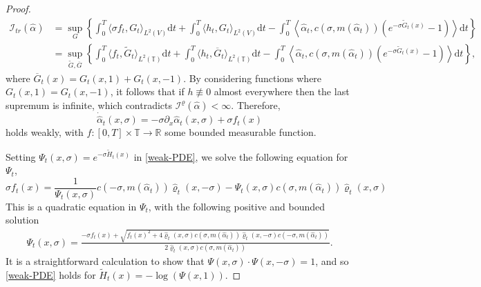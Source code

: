 \documentclass[11pt]{article}
\numberwithin{equation}{section}
\theoremstyle{definition}
\theoremstyle{plain}
\newcommand{\dd}{\mathrm{d}}
\newcommand{\nn}{\nonumber}
\begin{document}
\begin{proof}
\begin{align}
        \mathcal{I}_{tr}(\widehat{\alpha})
        &\nn= \sup_G \left\{\int_0^T \langle \sigma f_t, G_t\rangle_{L^2(V)} \dd t + \int_0^T \langle h_t, G_t \rangle_{L^2(V)} \dd t -\int_0^T \left\langle \widehat{\alpha}_t, c(\sigma,m(\widehat{\alpha}_t))\left( e^{-\sigma \widetilde{G}_t(x)}-1\right)\right\rangle \dd t \right\}\\
        &= \sup_{\widetilde{G},\overline{G}} \left\{ \int_0^T \langle f_t, \widetilde{G}_t\rangle_{L^2(\mathbb{T})} \dd t + \int_0^T \langle h_t, \overline{G}_t \rangle_{L^2(\mathbb{T})} \dd t -\int_0^T \left\langle \widehat{\alpha}_t, c(\sigma,m(\widehat{\alpha}_t))\left( e^{-\sigma \widetilde{G}_t(x)}-1\right)\right\rangle \dd t\right\},
    \end{align}
where  $\overline{G}_t(x) = G_t(x,1) + G_t(x,-1)$. By considering functions where $G_t(x,1) = G_t(x,-1)$, it follows that if $h\not\equiv 0$ almost everywhere then the last supremum is infinite, which contradicts $\mathcal{I}^{\varrho}(\widehat{\alpha})<\infty$. Therefore, 
    \begin{equation}\label{flux}
        \dot{\widehat{\alpha}}_t(x,\sigma) = -\sigma \partial_x \widehat{\alpha}_t(x,\sigma) + \sigma f_t(x)
    \end{equation}
holds weakly, with $f:[0,T]\times \mathbb{T}\to\mathbb{R}$ some bounded measurable function.

Setting $\Psi_t(x,\sigma) = e^{-\sigma \widetilde{H}_t(x)}$ in \eqref{weak-PDE}, we solve the following equation for $\Psi_t$, 
\begin{equation}\label{WA Psi}
\sigma f_t(x) =  \frac{1}{\Psi_t(x,\sigma)}  c(-\sigma, m(\widehat{\alpha}_t))\widehat{\varrho}_t(x,-\sigma) -\Psi_t(x,\sigma) c(\sigma, m(\widehat{\alpha}_t))\widehat{\varrho}_t(x,\sigma)
\end{equation}
This is a quadratic equation in $\Psi_t$, with the following positive and bounded solution
\begin{align}\label{Psi}
\Psi_t(x,\sigma) = \frac{-\sigma f_t(x) + \sqrt{f_t(x)^2 + 4\widehat{\varrho}_t(x,\sigma) c(\sigma,m(\widehat{\alpha}_t))\widehat{\varrho}_t(x,-\sigma) c(-\sigma,m(\widehat{\alpha}_t))}}{2\widehat{\varrho}_t(x,\sigma) c(\sigma,m(\widehat{\alpha}_t))}.
\end{align}
It is a straightforward calculation to show that $\Psi(x,\sigma) \cdot \Psi(x,-\sigma) = 1$, and so \eqref{weak-PDE} holds for $\widetilde{H}_t(x) = -\log(\Psi(x,1))$. 


\end{proof}
\end{document}

